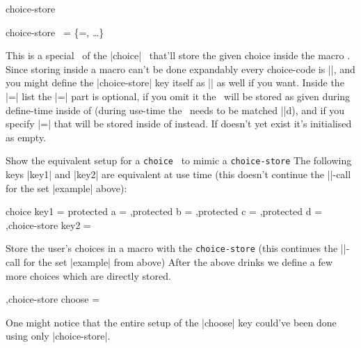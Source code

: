 \begin{function}[module=expkv-def type]{choice-store}
  \begin{syntax}
    choice-store \key\ = \{\val=, \ldots\} 
  \end{syntax}
  This is a special \type\ of the |choice| \type\ that'll store the given choice
  inside the macro . Since storing inside a macro can't be done
  expandably every choice-code is |\protected|, and you might define the
  |choice-store| key itself as |\protected| as well if you want. Inside the
  \val|=| list the |=| part is optional, if
  you omit it the \val\ will be stored as given during define-time inside of
   (during use-time the \val\ needs to be matched |\detokenize|d), and
  if you specify |=| that  will be stored
  inside of  instead. If  doesn't yet exist it's initialised
  as empty.
\end{function}
\begin{example}
    {Show the equivalent setup for a \texttt{choice} \type\ to mimic a
    \texttt{choice-store} \type}
  The following keys |key1| and |key2| are equivalent at use time (this doesn't
  continue the |\ekvdefinekeys|-call for the set |example| above):
  \begin{enverb}
    \newcommand*\mya{}%
      {
         choice key1 =
          {
             protected a = \def\mya{a}
            ,protected b = \def\mya{b}
            ,protected c = \def\mya{c}
            ,protected d = \def\mya{FOO}
          }
        ,choice-store key2 = 
      }
  \end{enverb}
\end{example}
\begin{example}
    {Store the user's choices in a macro with the \texttt{choice-store} \type}
  (this continues the |\ekvdefinekeys|-call for the set |example| from above)
  After the above drinks we define a few more choices which are directly stored.
  \begin{enverb}
        ,choice-store choose = 
  \end{enverb}
  One might notice that the entire setup of the |choose| key could've been done
  using only |choice-store|.
\end{example}

